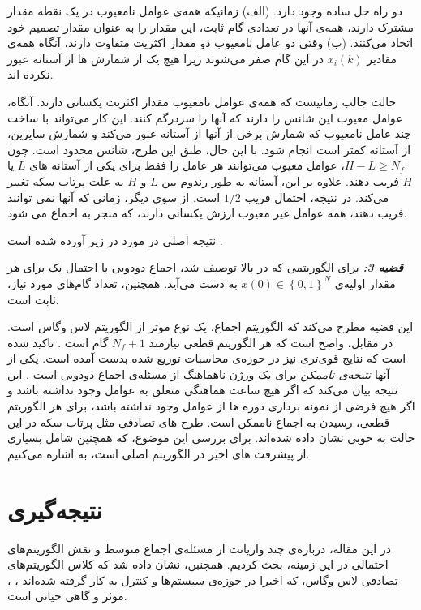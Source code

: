 \documentclass[12pt]{article} %
\begin{document}
دو راه حل ساده وجود دارد. (الف) زمانیکه همه‌ی عوامل نامعیوب در یک نقطه مقدار مشترک دارند، همه‌ی آنها در تعدادی گام ثابت، این مقدار را به عنوان مقدار تصمیم خود اتخاذ می‌کنند. (ب) وقتی دو عامل نامعیوب دو مقدار اکثریت متفاوت دارند، آنگاه همه‌ی مقادیر 
$x_{i}(k)$ 
در این گام صفر می‌شوند زیرا هیچ یک از شمارش ها از آستانه عبور نکرده اند.

حالت جالب زمانیست که همه‌ی عوامل نامعیوب مقدار اکثریت یکسانی دارند. آنگاه، عوامل معیوب این شانس را دارند که آنها را سردرگم کنند. این کار می‌تواند با ساخت چند عامل نامعیوب که شمارش برخی از آنها از آستانه عبور می‌کند و شمارش سایرین، از آستانه کمتر است انجام شود.
با این حال، طبق این طرح، شانس محدود است. چون 
$H−L \ge N_{f}$، 
عوامل معیوب می‌توانند هر عامل را فقط برای یکی از آستانه های 
$L$ 
یا 
$H$ 
فریب دهند. 
علاوه بر این، آستانه به طور رندوم بین 
$L$ 
و 
$H$ 
به علت پرتاب سکه تغییر می‌کند. در نتیجه، احتمال فریب 
$1/2$ 
است. از سوی دیگر، زمانی که آنها نمی توانند فریب دهند، همه عوامل غیر معیوب ارزش یکسانی دارند، که منجر به اجماع می شود.

نتیجه اصلی در مورد 
در زیر آورده شده است 
\cite{bib17}.

\textit{\textbf{قضیه 3:}} برای الگوریتمی که در بالا توصیف شد، اجماع دودویی با احتمال یک برای هر مقدار اولیه‌ی 
$x(0) \in \left\{ 0,1 \right\}^{N}$ 
به دست می‌آید. همچنین، تعداد گام‌های مورد نیاز، ثابت است.

این قضیه مطرح می‌کند که الگوریتم اجماع، یک نوع موثر از الگوریتم لاس وگاس است. در مقابل، واضح است که هر الگوریتم قطعی نیازمند 
$N_{f}+1$ 
گام است 
\cite{bib17}. 
تاکید شده است که نتایج قوی‌تری نیز در حوزه‌ی محاسبات توزیع شده بدست آمده است. یکی از آنها 
\textit{نتیجه‌ی ناممکن} 
برای یک ورژن ناهماهنگ از مسئله‌ی اجماع دودویی است 
\cite{bib09}.
 این نتیجه بیان می‌کند که اگر هیچ ساعت هماهنگی متعلق به عوامل وجود نداشته باشد و اگر هیچ فرضی از نمونه برداری دوره ها از عوامل وجود نداشته باشد، برای هر الگوریتم قطعی، رسیدن به اجماع ناممکن است. طرح های تصادفی مثل پرتاب سکه در این حالت به خوبی نشان داده شده‌اند. برای بررسی
 این موضوع، که همچنین شامل بسیاری از پیشرفت های اخیر در الگوریتم اصلی است، به 
 \cite{bib02} 
اشاره می‌کنیم.


	\section{نتیجه‌گیری}
	
	در این مقاله، درباره‌ی چند واریانت از مسئله‌ی اجماع متوسط و نقش الگوریتم‌های احتمالی در این زمینه، بحث کردیم. همچنبن، نشان داده شد که کلاس الگوریتم‌های تصادفی لاس وگاس، که اخیرا در حوزه‌ی سیستم‌ها و کنترل به کار گرفته شده‌اند
	\cite{bib11}، 
	\cite{bib24}، 
	موثر و گاهی حیاتی است.
	
\end{document}
